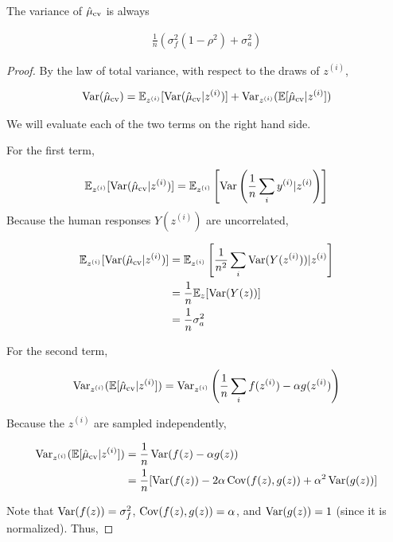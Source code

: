 \begin{lemma}
\label{lem:variance_calc}
The variance of $\hat \mu_\text{cv}$ is always

\begin{align}
\frac{1}{n}(\sigma^2_f (1-\rho^2) + \sigma^2_a)
\end{align}

\end{lemma}
\begin{proof}
By the law of total variance, with respect to the draws of $z^{(i)}$,

\begin{align}
\operatorname{Var}(\hat \mu_\text{cv}) = \mathbb{E}_{z^{(i)}}[\operatorname{Var}(\hat \mu_\text{cv} | z^{(i)})] + \operatorname{Var}_{z^{(i)}} ( \mathbb{E}[\hat \mu_\text{cv} | z^{(i)} ] ) 
\end{align}

We will evaluate each of the two terms on the right hand side. 

For the first term,

\begin{align}
\mathbb{E}_{z^{(i)}}[\operatorname{Var}(\hat \mu_\text{cv} | z^{(i)})] = \mathbb{E}_{z^{(i)}} \left[ \operatorname{Var} \left( \frac{1}{n} \sum_i y^{(i)} | z^{(i)} \right) \right]
\end{align}
Because the human responses $Y(z^{(i)})$ are uncorrelated,

\begin{align}
\mathbb{E}_{z^{(i)}}[\operatorname{Var}(\hat \mu_\text{cv} | z^{(i)})] &= \mathbb{E}_{z^{(i)}} \left[ \frac{1}{n^2} \sum_i \operatorname{Var}( Y(z^{(i)}) ) | z^{(i)} \right] \\
&= \frac{1}{n} \mathbb{E}_z [\operatorname{Var}(Y(z))] \\
&= \frac{1}{n} \sigma^2_a
\end{align}

For the second term,

\begin{align}
\operatorname{Var}_{z^{(i)}}( \mathbb{E}[\hat \mu_\text{cv} | z^{(i)}]) = \operatorname{Var}_{z^{(i)}} \left( \frac{1}{n} \sum_i f(z^{(i)}) - \alpha g(z^{(i)}) \right)
\end{align}

Because the $z^{(i)}$ are sampled independently,

\begin{align}
\operatorname{Var}_{z^{(i)}}( \mathbb{E}[\hat \mu_\text{cv} | z^{(i)}]) &= \frac{1}{n} \operatorname{Var}( f(z) - \alpha g(z)) \\
&= \frac{1}{n} [\operatorname{Var}(f(z)) - 2 \alpha \operatorname{Cov}(f(z),g(z)) + \alpha^2 \operatorname{Var}(g(z))]
\end{align}

Note that $\operatorname{Var}(f(z))=\sigma^2_f$, $\operatorname{Cov}(f(z),g(z))=\alpha$, and $\operatorname{Var}(g(z))=1$ (since it is normalized). Thus,


\end{proof}
